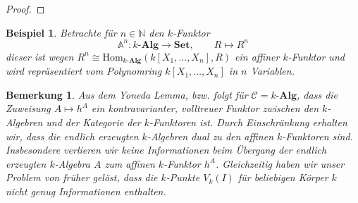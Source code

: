 \documentclass[a4paper, 11pt]{scrartcl}
\newcommand{\N}{\mathbb{N}}
\newcommand{\ringquot}[2]{{\raisebox{.2em}{\(#1\)}/\raisebox{-.2em}{\(#2\)}}}
\newcommand{\Hom}{\text{Hom}}
\newcommand{\CC}{\mathcal{C}}
\newcommand{\polynomials}{k[X_1, \ldots, X_n]}
\theoremstyle{basicstyle}
\newtheorem{bemerkung}[definition]{Bemerkung}
\newtheorem{beispiel}[definition]{Beispiel}
\begin{document}
    \begin{proof}
    \end{proof}

    \begin{beispiel}
        Betrachte für \(n \in \N\) den \(k\)-Funktor
        \[\mathbb{A}^n: k\textbf{-Alg} \to \textbf{Set}, \qquad R \mapsto R^n\]
        dieser ist wegen \(R^n \cong \Hom_{k\textbf{-Alg}}(\polynomials, R)\) ein affiner \(k\)-Funktor und wird repräsentiert vom Polynomring \(\polynomials\) in \(n\) Variablen.
    \end{beispiel}

    \begin{bemerkung}
        Aus dem Yoneda Lemma, bzw.  folgt für \(\CC = k\textbf{-Alg}\), dass die Zuweisung \(A \mapsto h^A\) ein kontravarianter, volltreuer Funktor zwischen den \(k\)-Algebren und der Kategorie der \(k\)-Funktoren ist.
        Durch Einschränkung erhalten wir, dass die \emph{endlich erzeugten} \(k\)-Algebren dual zu den affinen \(k\)-Funktoren sind.
        Insbesondere verlieren wir keine Informationen beim Übergang der endlich erzeugten \(k\)-Algebra \(A\) zum affinen \(k\)-Funktor \(h^A\).
        Gleichzeitig haben wir unser Problem von früher gelöst, dass die \(k\)-Punkte \(V_k(I)\) für beliebigen Körper \(k\) nicht genug Informationen enthalten.
    \end{bemerkung}
\end{document}

